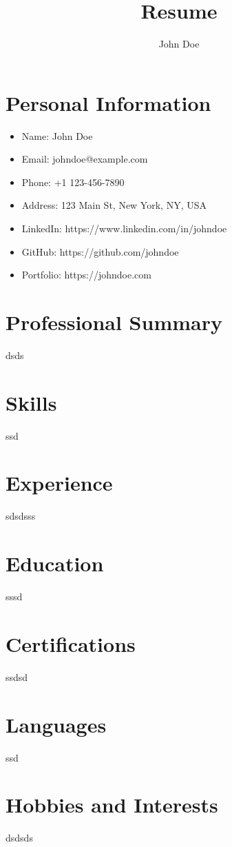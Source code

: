 \documentclass[11pt, a4paper]{article}
\title{Resume}
\author{John Doe}
\date{}
\begin{document}
\maketitle

\section*{Personal Information}
\begin{itemize}
    \item Name: John Doe
    \item Email: johndoe@example.com
    \item Phone: +1 123-456-7890
    \item Address: 123 Main St, New York, NY, USA
    \item LinkedIn: https://www.linkedin.com/in/johndoe
    \item GitHub: https://github.com/johndoe
    \item Portfolio: https://johndoe.com
\end{itemize}

\section*{Professional Summary}
dsds

\section*{Skills}
ssd

\section*{Experience}
sdsdsss

\section*{Education}
sssd

\section*{Certifications}
ssdsd

\section*{Languages}
ssd

\section*{Hobbies and Interests}
dsdsds
\end{document}
